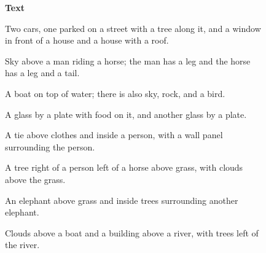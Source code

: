 \documentclass[10pt,twocolumn,letterpaper]{article}
\begin{document}
\begin{figure*}[ht!]
  \begin{rotate}{90}
    \hspace{-2mm}\textbf{Text}
  \end{rotate}
  \hspace{\qualtextspace}
  \begin{minipage}{\qualtext}
    \ssmall
    Two cars, one parked on a street with a tree along it, and
    a window in front of a house and a house with a roof.
  \end{minipage}
  \hspace{\qualtextspace}
  \begin{minipage}{\qualtext}
    \ssmall
    Sky above a man riding a horse; the man has a leg and the horse
    has a leg and a tail.
  \end{minipage}
  \hspace{\qualtextspace}
  \begin{minipage}{\qualtext}
    \ssmall
    A boat on top of water; there is also sky, rock, and a bird.
  \end{minipage}
  \hspace{\qualtextspace}
  \begin{minipage}{\qualtext}
    \ssmall
    A glass by a plate with food on it, and another glass by a plate.
  \end{minipage}
  \hspace{\qualtextspace}
  \begin{minipage}{\qualtext}
    \ssmall
    A tie above clothes and inside a person, with a wall panel surrounding
    the person.
  \end{minipage}
  \hspace{\qualtextspace}
  \begin{minipage}{\qualtext}
    \ssmall
    A tree right of a person left of a horse above grass, with clouds
    above the grass.
  \end{minipage}
  \hspace{\qualtextspace}
  \begin{minipage}{\qualtext}
    \ssmall
    An elephant above grass and inside trees surrounding another elephant.
  \end{minipage}
  \hspace{\qualtextspace}
  \begin{minipage}{\qualtext}
    \ssmall
    Clouds above a boat and a building above a river, with trees left of
    the river.
  \end{minipage} \\
  \begin{rotate}{90}

\end{rotate}
\end{figure*}
\end{document}
